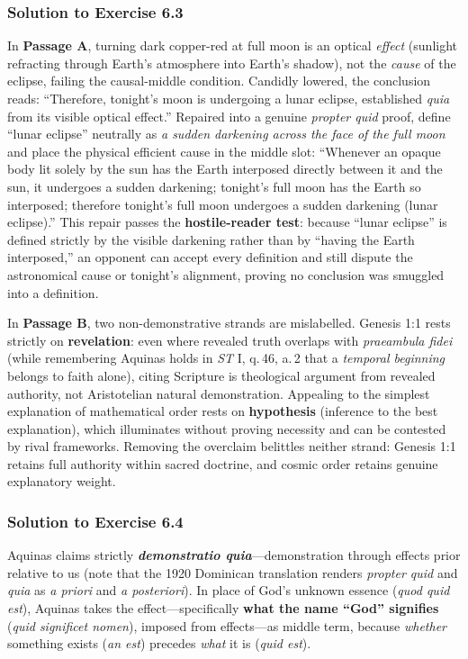 \subsubsection*{Solution to Exercise 6.3}
In \textbf{Passage A}, turning dark copper-red at full moon is an optical \emph{effect} (sunlight refracting through Earth's atmosphere into Earth's shadow), not the \emph{cause} of the eclipse, failing the causal-middle condition. Candidly lowered, the conclusion reads: ``Therefore, tonight's moon is undergoing a lunar eclipse, established \emph{quia} from its visible optical effect.'' Repaired into a genuine \emph{propter quid} proof, define ``lunar eclipse'' neutrally as \emph{a sudden darkening across the face of the full moon} and place the physical efficient cause in the middle slot: ``Whenever an opaque body lit solely by the sun has the Earth interposed directly between it and the sun, it undergoes a sudden darkening; tonight's full moon has the Earth so interposed; therefore tonight's full moon undergoes a sudden darkening (lunar eclipse).'' This repair passes the \textbf{hostile-reader test}: because ``lunar eclipse'' is defined strictly by the visible darkening rather than by ``having the Earth interposed,'' an opponent can accept every definition and still dispute the astronomical cause or tonight's alignment, proving no conclusion was smuggled into a definition.

In \textbf{Passage B}, two non-demonstrative strands are mislabelled. Genesis 1:1 rests strictly on \textbf{revelation}: even where revealed truth overlaps with \emph{praeambula fidei} (while remembering Aquinas holds in \emph{ST} I, q.\,46, a.\,2 that a \emph{temporal beginning} belongs to faith alone), citing Scripture is theological argument from revealed authority, not Aristotelian natural demonstration. Appealing to the simplest explanation of mathematical order rests on \textbf{hypothesis} (inference to the best explanation), which illuminates without proving necessity and can be contested by rival frameworks. Removing the overclaim belittles neither strand: Genesis 1:1 retains full authority within sacred doctrine, and cosmic order retains genuine explanatory weight.

\subsubsection*{Solution to Exercise 6.4}
Aquinas claims strictly \textbf{\emph{demonstratio quia}}---demonstration through effects prior relative to us (note that the 1920 Dominican translation renders \emph{propter quid} and \emph{quia} as \emph{a priori} and \emph{a posteriori}). In place of God's unknown essence (\emph{quod quid est}), Aquinas takes the effect---specifically \textbf{what the name ``God'' signifies} (\emph{quid significet nomen}), imposed from effects---as middle term, because \emph{whether} something exists (\emph{an est}) precedes \emph{what} it is (\emph{quid est}).

